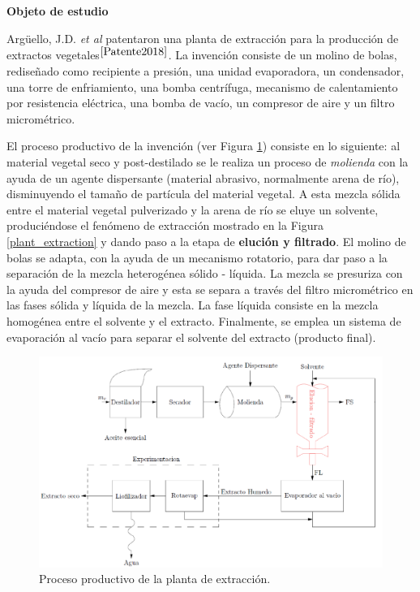 \noindent
\justify

\textbf{\Large Objeto de estudio}

\noindent
\justify

Arg\"uello, J.D. \textit{et al} patentaron una planta de extracci\'on para la producci\'on de extractos vegetales$^{\cite{Patente2018}}$. La invenci\'on consiste de un molino de bolas, redise\~nado como recipiente a presi\'on, una unidad evaporadora, un condensador, una torre de enfriamiento, una bomba centr\'ifuga, mecanismo de calentamiento por resistencia el\'ectrica, una bomba de vac\'io, un compresor de aire y un filtro microm\'etrico.

\noindent
\justify

El proceso productivo de la invenci\'on (ver Figura \ref{planta}) consiste en lo siguiente: al material vegetal seco y post-destilado se le realiza un proceso de \textit{molienda} con la ayuda de un agente dispersante (material abrasivo, normalmente arena de r\'io), disminuyendo el tama\~no de part\'icula del material vegetal. A esta mezcla s\'olida entre el material vegetal pulverizado y la arena de r\'io se eluye un solvente, produci\'endose el fen\'omeno de extracci\'on mostrado en la Figura \ref{plant_extraction} y dando paso a la etapa de \textbf{eluci\'on y filtrado}. El molino de bolas se adapta, con la ayuda de un mecanismo rotatorio, para dar paso a la separaci\'on de la mezcla heterog\'enea s\'olido - l\'iquida. La mezcla se presuriza con la ayuda del compresor de aire y esta se separa a trav\'es del filtro microm\'etrico en las fases s\'olida y l\'iquida de la mezcla. La fase l\'iquida consiste en la mezcla homog\'enea entre el solvente y el extracto. Finalmente, se emplea un sistema de evaporaci\'on al vac\'io para separar el solvente del extracto (producto final). 

\begin{figure}[h!]
	\centering
	\includegraphics[width=\textwidth]{Images/Planta.png}
	\caption{Proceso productivo de la planta de extracci\'on.}
	\label{planta}
\end{figure}

